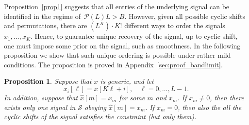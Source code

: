 \documentclass[english,12pt]{article}
\newcommand{\hx}{\hat{x}}
\newcommand{\TODO}[1]{{\color{red}{[#1]}}}
\numberwithin{equation}{section}
\numberwithin{thm}{section} %
\newtheorem{prop}[thm]{Proposition}
\begin{document}
Proposition~\ref{prop1} suggests that all entries of the underlying signal can be identified in the regime of~$\mathcal{P}(L)L>B$. However, given all possible cyclic shifts and permutations, there are $(L^K)\cdot K!$ \TODO{check this number}  different ways to order the signals $x_1,\ldots,x_K$. Hence, to guarantee unique recovery of the signal, up to cyclic shift, one must impose some prior on the signal, such as smoothness. In the following proposition we show that such unique ordering is possible under rather mild conditions.
The proposition is proved  in Appendix~\ref{sec:proof_bandlimit}.
\begin{prop} \label{prop:bandlimit}
Suppose that $x$ is generic, and let 
\begin{equation} %
x_i[\ell] = x[K\ell + i], \quad \ell=0,\ldots,L-1.
\end{equation}
In addition, suppose that $\hx[m]=x_m$ for some $m$ and $x_m$.
If $x_m\neq 0$, then there exists only one signal in $\mathcal{S}$ obeying $\hx[m]=x_m$. If $x_m=0$, then also the all the cyclic shifts of the signal satisfies the constraint (but only them). 
\end{prop}	
\end{document}
